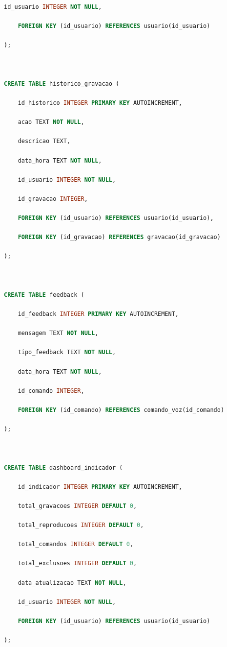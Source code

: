 \documentclass[12pt,oneside,a4paper,brazil,final]{abntex2}
\begin{document}
\begin{lstlisting}[language=SQL]
    id_usuario INTEGER NOT NULL,

    FOREIGN KEY (id_usuario) REFERENCES usuario(id_usuario)

);



CREATE TABLE historico_gravacao (

    id_historico INTEGER PRIMARY KEY AUTOINCREMENT,

    acao TEXT NOT NULL,

    descricao TEXT,

    data_hora TEXT NOT NULL,

    id_usuario INTEGER NOT NULL,

    id_gravacao INTEGER,

    FOREIGN KEY (id_usuario) REFERENCES usuario(id_usuario),

    FOREIGN KEY (id_gravacao) REFERENCES gravacao(id_gravacao)

);



CREATE TABLE feedback (

    id_feedback INTEGER PRIMARY KEY AUTOINCREMENT,

    mensagem TEXT NOT NULL,

    tipo_feedback TEXT NOT NULL,

    data_hora TEXT NOT NULL,

    id_comando INTEGER,

    FOREIGN KEY (id_comando) REFERENCES comando_voz(id_comando)

);



CREATE TABLE dashboard_indicador (

    id_indicador INTEGER PRIMARY KEY AUTOINCREMENT,

    total_gravacoes INTEGER DEFAULT 0,

    total_reproducoes INTEGER DEFAULT 0,

    total_comandos INTEGER DEFAULT 0,

    total_exclusoes INTEGER DEFAULT 0,

    data_atualizacao TEXT NOT NULL,

    id_usuario INTEGER NOT NULL,

    FOREIGN KEY (id_usuario) REFERENCES usuario(id_usuario)

);

\end{lstlisting}
\end{document}
